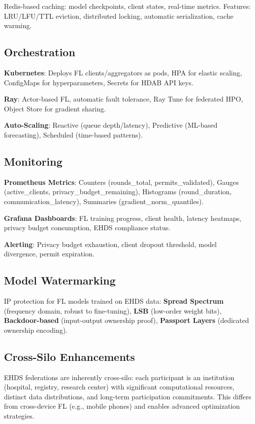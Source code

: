 \documentclass[conference,a4paper]{IEEEtran}
\begin{document}
Redis-based caching: model checkpoints, client states, real-time metrics. Features: LRU/LFU/TTL eviction, distributed locking, automatic serialization, cache warming.

\subsection{Orchestration}

\textbf{Kubernetes}: Deploys FL clients/aggregators as pods, HPA for elastic scaling, ConfigMaps for hyperparameters, Secrets for HDAB API keys.

\textbf{Ray}: Actor-based FL, automatic fault tolerance, Ray Tune for federated HPO, Object Store for gradient sharing.

\textbf{Auto-Scaling}: Reactive (queue depth/latency), Predictive (ML-based forecasting), Scheduled (time-based patterns).

\subsection{Monitoring}

\textbf{Prometheus Metrics}: Counters (rounds\_total, permits\_validated), Gauges (active\_clients, privacy\_budget\_remaining), Histograms (round\_duration, communication\_latency), Summaries (gradient\_norm\_quantiles).

\textbf{Grafana Dashboards}: FL training progress, client health, latency heatmaps, privacy budget consumption, EHDS compliance status.

\textbf{Alerting}: Privacy budget exhaustion, client dropout threshold, model divergence, permit expiration.

\subsection{Model Watermarking}

IP protection for FL models trained on EHDS data: \textbf{Spread Spectrum} (frequency domain, robust to fine-tuning), \textbf{LSB} (low-order weight bits), \textbf{Backdoor-based} (input-output ownership proof), \textbf{Passport Layers} (dedicated ownership encoding).

\subsection{Cross-Silo Enhancements}

EHDS federations are inherently cross-silo: each participant is an institution (hospital, registry, research center) with significant computational resources, distinct data distributions, and long-term participation commitments. This differs from cross-device FL (e.g., mobile phones) and enables advanced optimization strategies.
\end{document}

